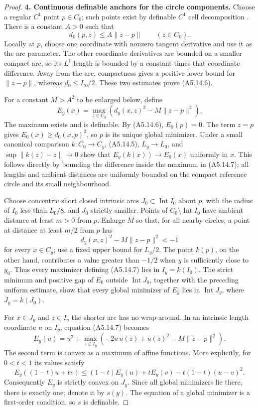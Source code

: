 \begin{proof}
\medskip\noindent\textbf{4. Continuous definable anchors for the circle components.}
Choose a regular $C^1$ point $p\in C_0$; such points exist by
definable $C^1$ cell decomposition
\cite[Theorem 6.6, p.71]{A5-Coste}.  There is a constant
$A>0$ such that
\[
                     d_0(p,z)\leq A\|z-p\|\qquad(z\in C_0).
 \tag{A5.14.6}
\]
Locally at $p$, choose one coordinate with nonzero tangent
derivative and use it as the arc parameter.  The other
coordinate derivatives are bounded on a smaller compact arc,
so its $L^1$ length is bounded by a constant times that
coordinate difference.  Away from the arc, compactness gives
a positive lower bound for $\|z-p\|$, whereas $d_0\leq L_0/2$.
These two estimates prove (A5.14.6).

For a constant $M>A^2$ to be enlarged below, define
\[
 E_y(x)=\max_{z\in C_y}
             \left(d_y(x,z)^2-M\|z-p\|^2\right).
 \tag{A5.14.7}
\]
The maximum exists and is definable.  By (A5.14.6),
$E_0(p)=0$.  The term $z=p$ gives
$E_0(x)\geq d_0(x,p)^2$, so $p$ is its unique global
minimizer.  Under a small canonical comparison
$k:C_0\to C_y$, (A5.14.5), $L_y\to L_0$, and
$\sup\|k(z)-z\|\to0$ show that
$E_y(k(x))\to E_0(x)$ uniformly in $x$.  This follows directly
by bounding the difference inside the maximum in (A5.14.7);
all lengths and ambient distances are uniformly bounded on
the compact reference circle and its small neighbourhood.

Choose concentric short closed intrinsic arcs $J_0\subset
\operatorname{Int}I_0$ about $p$, with the radius of $I_0$
less than $L_0/8$, and $J_0$ strictly smaller.  Points of
$C_0\setminus\operatorname{Int}I_0$ have ambient distance
at least $m>0$ from $p$.  Enlarge $M$ so that, for all nearby
circles, a point at distance at least $m/2$ from $p$ has
\[
            d_y(x,z)^2-M\|z-p\|^2<-1
\]
for every $x\in C_y$; use a fixed upper bound for $L_y/2$.
The point $k(p)$, on the other hand, contributes a value
greater than $-1/2$ when $y$ is sufficiently close to $y_0$.
Thus every maximizer defining (A5.14.7) lies in $I_y=k(I_0)$.
The strict minimum and positive gap of $E_0$ outside
$\operatorname{Int}J_0$, together with the preceding uniform
estimate, show that every global minimizer of $E_y$ lies in
$\operatorname{Int}J_y$, where $J_y=k(J_0)$.

For $x\in J_y$ and $z\in I_y$ the shorter arc has no
wrap-around.  In an intrinsic length coordinate $u$ on
$I_y$, equation (A5.14.7) becomes
\[
 E_y(u)=u^2+\max_{z\in I_y}
       \left(-2u\,u(z)+u(z)^2-M\|z-p\|^2\right).
 \tag{A5.14.8}
\]
The second term is convex as a maximum of affine functions.
More explicitly, for $0<t<1$ its values satisfy
\[
 E_y((1-t)u+tv)\leq(1-t)E_y(u)+tE_y(v)-t(1-t)(u-v)^2.
\]
Consequently $E_y$ is strictly convex on $J_y$.  Since all
global minimizers lie there, there is exactly one; denote it
by $s(y)$.  The equation of a global minimizer is a first-order
condition, so $s$ is definable.


\end{proof}
